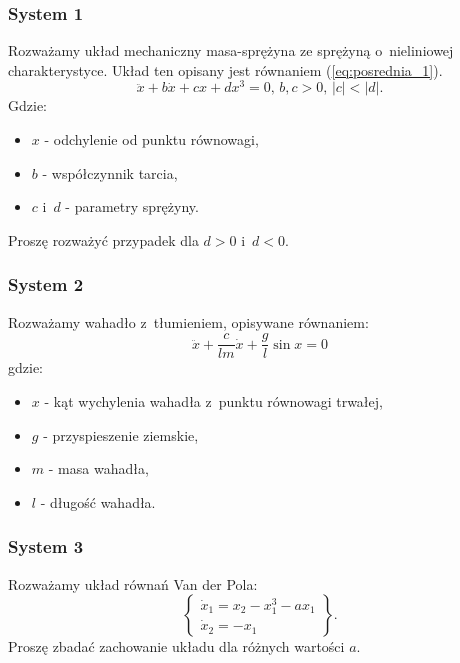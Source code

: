 \documentclass{sprawozdanie-agh}
\begin{document}
        \subsubsection{System 1}
        Rozważamy układ mechaniczny masa-sprężyna ze sprężyną o~nieliniowej charakterystyce.
        Układ ten opisany jest równaniem (\ref{eq:posrednia_1}).
        \begin{equation}\label{eq:posrednia_1}
            \ddot{x} + b\dot{x} + cx + dx^{3} = 0, \, b,c > 0,\, |c|<|d|.
        \end{equation}
        Gdzie:
        \begin{itemize}
            \item $x$ - odchylenie od punktu równowagi,
            \item $b$ - współczynnik tarcia,
            \item $c$ i~$d$ - parametry sprężyny.
        \end{itemize}
        Proszę rozważyć przypadek dla $d>0$ i~$d<0$.

        \subsubsection{System 2}
        Rozważamy wahadło z~tłumieniem, opisywane równaniem:
        \begin{equation}\label{eq:posrednia_2}
            \ddot{x} + \frac{c}{lm}\dot{x} + \frac{g}{l}\sin{x} = 0
        \end{equation}
        gdzie:
        \begin{itemize}
            \item $x$ - kąt wychylenia wahadła z~punktu równowagi trwałej,
            \item $g$ - przyspieszenie ziemskie,
            \item $m$ - masa wahadła,
            \item $l$ - długość wahadła.
        \end{itemize}

        \subsubsection{System 3}
        Rozważamy układ równań Van der Pola:
        \begin{equation}
            \label{eq:posrednia_3}
            \left\{
            \begin{array}{l}
                 \dot{x}_{1} = x_{2} - x_{1}^{3} - ax_{1}\\
                 \dot{x}_{2} = -x_{1}
            \end{array}
            \right\}.
        \end{equation}
        Proszę zbadać zachowanie układu dla różnych wartości $a$.
\end{document}
